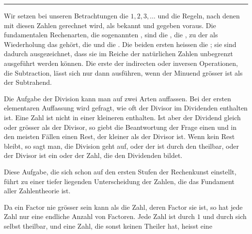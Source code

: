 \begin{center}
{\large{}}

\rule{0.18\linewidth}{0.4pt}
\end{center}

Wir setzen bei unseren Betrachtungen die  $1,2,3,\ldots$ und die Regeln, nach denen mit diesen
Zahlen gerechnet wird, als bekannt und gegeben voraus. Die
fundamentalen Rechenarten, die sogenannten ,
sind die , die , zu der als
Wiederholung das  gehört, die 
und die . Die beiden ersten heissen die ; sie sind dadurch ausgezeichnet, dass sie im
Reiche der natürlichen Zahlen unbegrenzt ausgeführt werden können.
Die erste der indirecten oder inversen Operationen, die Subtraction,
lässt sich nur dann ausführen, wenn der Minuend grösser ist als der
Subtrahend.

Die Aufgabe der Division kann man auf zwei Arten auffassen. Bei der
ersten elementaren Auffassung wird gefragt, wie oft der Divisor im
Dividenden enthalten ist. Eine Zahl ist nicht in einer kleineren
enthalten. Ist aber der Dividend gleich oder grösser als der Divisor,
so giebt die Beantwortung der Frage einen  und in
den meisten Fällen einen Rest, der kleiner als der Divisor ist. Wenn
kein Rest bleibt, so sagt man, die Division geht auf, oder der
 ist durch den  theilbar, oder der
Divisor ist ein  oder  der Zahl, die
den Dividenden bildet.

Diese Aufgabe, die sich schon auf den ersten Stufen der Rechenkunst
einstellt, führt zu einer tiefer liegenden Unterscheidung der Zahlen,
die das Fundament aller Zahlentheorie ist.

Da ein Factor nie grösser sein kann als die Zahl, deren Factor sie
ist, so hat jede Zahl nur eine endliche Anzahl von Factoren. Jede Zahl
ist durch $1$ und durch sich selbst theilbar, und eine Zahl, die sonst
keinen Theiler hat, heisst eine 
